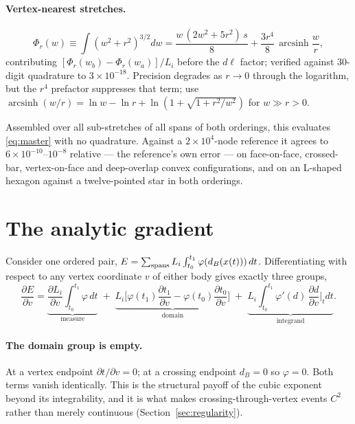 \documentclass[11pt]{article}
\newcommand{\asinh}{\operatorname{arcsinh}}
\begin{document}
\paragraph{Vertex-nearest stretches.}
\begin{equation}
\Phi_r(w) \equiv \int(w^2+r^2)^{3/2}dw = \frac{w\,(2w^2+5r^2)\,s}{8} + \frac{3r^4}{8}\,\asinh\frac{w}{r},
\label{eq:Ivert}
\end{equation}
contributing $[\Phi_r(w_b)-\Phi_r(w_a)]/L_i$ before the $d\ell$ factor; verified against $30$-digit quadrature to $3\times10^{-18}$. Precision degrades as $r\to0$ through the logarithm, but the $r^4$ prefactor suppresses that term; use $\asinh(w/r) = \ln w - \ln r + \ln(1+\sqrt{1+r^2/w^2})$ for $w \gg r > 0$.

Assembled over all sub-stretches of all spans of both orderings, this evaluates \eqref{eq:master} with no quadrature. Against a $2\times10^4$-node reference it agrees to $6\times10^{-10}$--$10^{-8}$ relative --- the reference's own error --- on face-on-face, crossed-bar, vertex-on-face and deep-overlap convex configurations, and on an L-shaped hexagon against a twelve-pointed star in both orderings.

\section{The analytic gradient}
\label{sec:gradient}

Consider one ordered pair, $E = \sum_{\rm spans} L_i\int_{t_0}^{t_1}\varphi(d_B(x(t)))\,dt$. Differentiating with respect to any vertex coordinate $v$ of either body gives exactly three groups,
\begin{equation}
\frac{\partial E}{\partial v} = \underbrace{\frac{\partial L_i}{\partial v}\int_{t_0}^{t_1}\!\!\varphi\,dt}_{\text{measure}}
\;+\; \underbrace{L_i\Big[\varphi(t_1)\frac{\partial t_1}{\partial v} - \varphi(t_0)\frac{\partial t_0}{\partial v}\Big]}_{\text{domain}}
\;+\; \underbrace{L_i\int_{t_0}^{t_1}\!\!\varphi'(d)\,\frac{\partial d}{\partial v}\bigg|_t dt}_{\text{integrand}} .
\label{eq:threegroups}
\end{equation}

\paragraph{The domain group is empty.} At a vertex endpoint $\partial t/\partial v = 0$; at a crossing endpoint $d_B = 0$ so $\varphi = 0$. Both terms vanish identically. This is the structural payoff of the cubic exponent beyond its integrability, and it is what makes crossing-through-vertex events $C^2$ rather than merely continuous (Section~\ref{sec:regularity}).
\end{document}

